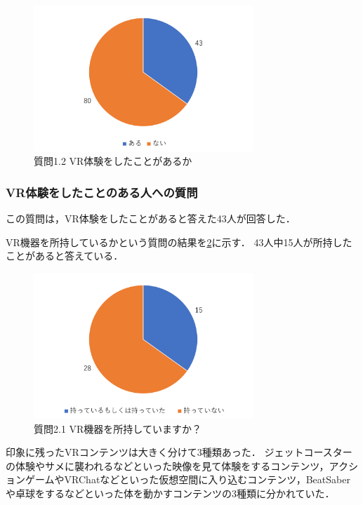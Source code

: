 \documentclass[12pt,a4j]{ltjsarticle}
\begin{document}
\begin{figure}[h]
\begin{center}
 \includegraphics[clip,height=55mm]{アンケート結果1_1_2.pdf}
\end{center}
 \caption{質問1.2 VR体験をしたことがあるか}
 \label{fig:アンケート結果1_1_2.pdf}
\end{figure}

\subsubsection{VR体験をしたことのある人への質問}
この質問は，VR体験をしたことがあると答えた43人が回答した．

VR機器を所持しているかという質問の結果を\ref{fig:アンケート結果1_2_1.pdf}に示す．
43人中15人が所持したことがあると答えている．

\begin{figure}[h]
\begin{center}
 \includegraphics[clip,height=55mm]{アンケート結果1_2_1.pdf}
\end{center}
 \caption{質問2.1 VR機器を所持していますか？}
 \label{fig:アンケート結果1_2_1.pdf}
\end{figure}

印象に残ったVRコンテンツは大きく分けて3種類あった．
ジェットコースターの体験やサメに襲われるなどといった映像を見て体験をするコンテンツ，アクションゲームやVRChatなどといった仮想空間に入り込むコンテンツ，BeatSaberや卓球をするなどといった体を動かすコンテンツの3種類に分かれていた．
\end{document}
